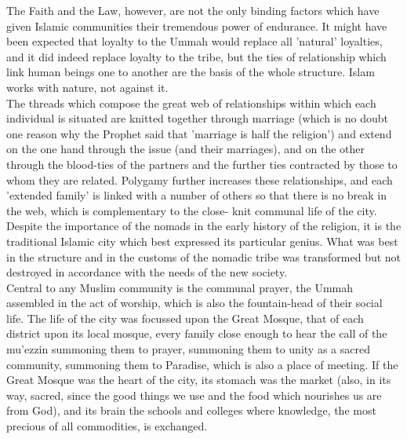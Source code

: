 \documentclass[10pt, twoside,openright]{book}
\begin{document}
The Faith and the Law, however, are not the only binding factors which have given Islamic communities 
their tremendous power of endurance. It might have been expected that loyalty to the Ummah would 
replace all 'natural' loyalties, and it did indeed replace loyalty to the tribe, but the ties of 
relationship which link human beings one to another are the basis of the whole structure. Islam works 
with nature, not against it. \\

The threads which compose the great web of relationships within which each individual is situated are 
knitted together through marriage (which is no doubt one reason why the Prophet said that 'marriage 
is half the religion') and extend on the one hand through the issue (and their marriages), and on the 
other through the blood\hyp{}ties of the partners and the further ties contracted by those to whom they 
are related. Polygamy further increases these relationships, and each 'extended family' is linked 
with a number of others so that there is no break in the web, which is complementary to the close\hyp{}
knit communal life of the city. \\

Despite the importance of the nomads in the early history of the religion, it is the traditional 
Islamic city which best expressed its particular genius. What was best in the structure and in the 
customs of the nomadic tribe was transformed but not destroyed in accordance with the needs of the 
new society. \\

Central to any Muslim community is the communal prayer, the Ummah assembled in the act of worship, 
which is also the fountain\hyp{}head of their social life. The life of the city was focussed upon the Great 
Mosque, that of each district upon its local mosque, every family close enough to hear the call of 
the mu'ezzin summoning them to prayer, summoning them to unity as a sacred community, summoning them 
to Paradise, which is also a place of meeting. If the Great Mosque was the heart of the city, its 
stomach was the market (also, in its way, sacred, since the good things we use and the food which 
nourishes us are from God), and its brain the schools and colleges where knowledge, the most precious 
of all commodities, is exchanged. \\
\end{document}
